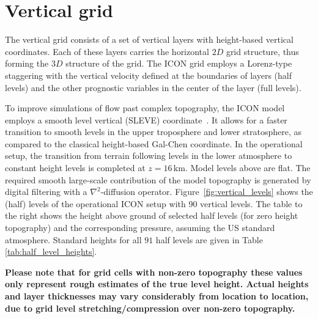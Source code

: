 \section{Vertical grid}

The vertical grid consists of a set of vertical layers with height-based vertical coordinates.
Each of these layers carries the horizontal $2D$ grid structure, thus forming the $3D$ structure of the grid.
The ICON grid employs a Lorenz-type staggering with the vertical velocity defined at the boundaries of layers (half levels) 
and the other prognostic variables in the center of the layer (full levels).

To improve simulations of flow past complex topography, the ICON model employs a smooth level vertical (SLEVE) coordinate~\citep{Leuenberger2010}. 
It allows for a faster transition to smooth levels in the upper troposphere and lower stratosphere, as compared to the classical height-based Gal-Chen 
coordinate. In the operational setup, the transition from terrain following levels in the lower atmosphere to constant height levels is completed 
at $z=16\,\mathrm{km}$. Model levels above are flat. The required smooth large-scale contribution of the model topography is generated by 
digital filtering with a $\nabla^2$-diffusion operator. Figure~\ref{fig:vertical_levels} shows the (half) levels of the operational 
ICON setup with 90 vertical levels. The table to the right shows the height above ground of selected half levels (for zero height topography) 
and the corresponding pressure, assuming the US standard atmosphere. Standard heights for all $91$ half levels are given in Table 
\ref{tab:half_level_heights}.

\textbf{Please note that for grid cells with non-zero topography these values only represent rough estimates of the true level height. 
Actual heights and layer thicknesses may vary considerably from location to location, due to grid level stretching/compression over 
non-zero topography.}
  



